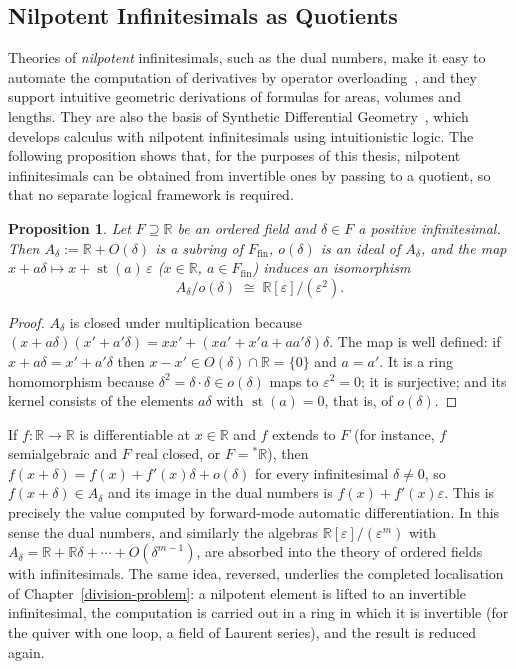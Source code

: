 \documentclass[12pt, a4paper]{report}
\theoremstyle{plain}
\newtheorem{proposition}[theorem]{Proposition}
\theoremstyle{definition}
\theoremstyle{remark}
\theoremstyle{plain}
\newcommand{\RR}{\mathbb{R}}
\newcommand{\st}{\operatorname{st}}
\begin{document}
\subsection{Nilpotent Infinitesimals as Quotients}
Theories of \emph{nilpotent} infinitesimals, such as the dual numbers, make it easy to automate the computation of derivatives by operator overloading~\cite{GriewankWalther2008}, and they support intuitive geometric derivations of formulas for areas, volumes and lengths. They are also the basis of Synthetic Differential Geometry~\cite{Kock2006}, which develops calculus with nilpotent infinitesimals using intuitionistic logic. The following proposition shows that, for the purposes of this thesis, nilpotent infinitesimals can be obtained from invertible ones by passing to a quotient, so that no separate logical framework is required.

\begin{proposition}\label{prop:dual-quotient}
Let $F\supseteq\RR$ be an ordered field and $\delta\in F$ a positive infinitesimal. Then $A_\delta:=\RR+O(\delta)$ is a subring of $F_{\mathrm{fin}}$, $o(\delta)$ is an ideal of $A_\delta$, and the map $x+a\delta\mapsto x+\st(a)\,\varepsilon$ ($x\in\RR$, $a\in F_{\mathrm{fin}}$) induces an isomorphism
\[ A_\delta/o(\delta)\;\cong\;\RR[\varepsilon]/(\varepsilon^2). \]
\end{proposition}
\begin{proof}
$A_\delta$ is closed under multiplication because $(x+a\delta)(x'+a'\delta)=xx'+(xa'+x'a+aa'\delta)\delta$. The map is well defined: if $x+a\delta=x'+a'\delta$ then $x-x'\in O(\delta)\cap\RR=\{0\}$ and $a=a'$. It is a ring homomorphism because $\delta^2=\delta\cdot\delta\in o(\delta)$ maps to $\varepsilon^2=0$; it is surjective; and its kernel consists of the elements $a\delta$ with $\st(a)=0$, that is, of $o(\delta)$.
\end{proof}

If $f:\RR\to\RR$ is differentiable at $x\in\RR$ and $f$ extends to $F$ (for instance, $f$ semialgebraic and $F$ real closed, or $F={}^*\RR$), then $f(x+\delta)=f(x)+f'(x)\delta+o(\delta)$ for every infinitesimal $\delta\neq0$, so $f(x+\delta)\in A_\delta$ and its image in the dual numbers is $f(x)+f'(x)\varepsilon$. This is precisely the value computed by forward-mode automatic differentiation. In this sense the dual numbers, and similarly the algebras $\RR[\varepsilon]/(\varepsilon^{m})$ with $A_\delta=\RR+\RR\delta+\cdots+O(\delta^{m-1})$, are absorbed into the theory of ordered fields with infinitesimals. The same idea, reversed, underlies the completed localisation of Chapter~\ref{division-problem}: a nilpotent element is lifted to an invertible infinitesimal, the computation is carried out in a ring in which it is invertible (for the quiver with one loop, a field of Laurent series), and the result is reduced again.
\end{document}

